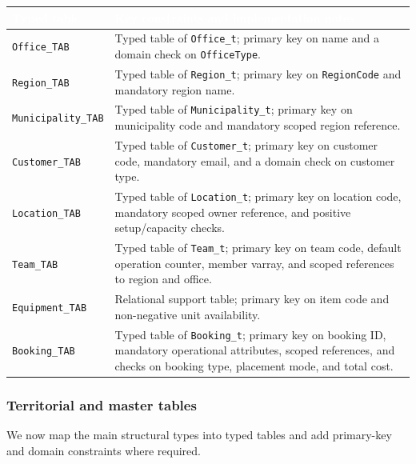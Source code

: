 \documentclass[12pt,a4paper]{article}
\begin{document}
\begin{center}
\renewcommand{\arraystretch}{1.4}
\small
\begin{tabularx}{0.95\textwidth}{|Y|Y|}
\hline
{}
\textcolor{white}{\textbf{Typed table}} & \textcolor{white}{\textbf{Key constraints and implementation notes}} \\ \hline
\texttt{Office\_TAB} & Typed table of \texttt{Office\_t}; primary key on name and a domain check on \texttt{OfficeType}. \\ \hline
\texttt{Region\_TAB} & Typed table of \texttt{Region\_t}; primary key on \texttt{RegionCode} and mandatory region name. \\ \hline
\texttt{Municipality\_TAB} & Typed table of \texttt{Municipality\_t}; primary key on municipality code and mandatory scoped region reference. \\ \hline
\texttt{Customer\_TAB} & Typed table of \texttt{Customer\_t}; primary key on customer code, mandatory email, and a domain check on customer type. \\ \hline
\texttt{Location\_TAB} & Typed table of \texttt{Location\_t}; primary key on location code, mandatory scoped owner reference, and positive setup/capacity checks. \\ \hline
\texttt{Team\_TAB} & Typed table of \texttt{Team\_t}; primary key on team code, default operation counter, member varray, and scoped references to region and office. \\ \hline
\texttt{Equipment\_TAB} & Relational support table; primary key on item code and non-negative unit availability. \\ \hline
\texttt{Booking\_TAB} & Typed table of \texttt{Booking\_t}; primary key on booking ID, mandatory operational attributes, scoped references, and checks on booking type, placement mode, and total cost. \\ \hline
\end{tabularx}
\end{center}

\subsubsection*{Territorial and master tables}
We now map the main structural types into typed tables and add primary-key and domain constraints where required.
\end{document}
